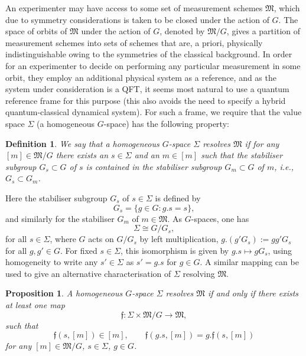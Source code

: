 \documentclass[sn-mathphys-num]{sn-jnl}%
\numberwithin{equation}{section}
\theoremstyle{thmstyleone}%
\newtheorem{proposition}[theorem]{Proposition}%
\theoremstyle{thmstyletwo}%
\theoremstyle{thmstylethree}%
\newtheorem{definition}[theorem]{Definition}%
\begin{document}
An experimenter may have access to some set of measurement schemes $\mathfrak{M}$, which due to symmetry considerations is taken to be closed under the action of $G$. The space of orbits of $\mathfrak{M}$ under the action of $G$, denoted by $\mathfrak{M}/G$, gives a partition of measurement schemes into sets of schemes that are, a priori, physically indistinguishable owing to the symmetries of the classical background. In order for an experimenter to decide on performing any particular measurement in some orbit, they 
employ an additional physical system as a reference, and as the system under consideration is a QFT, it seems most natural to 
use a quantum reference frame for this purpose (this also avoids the need to specify a hybrid quantum-classical dynamical system). For such a frame, we require that the value space $\Sigma$ (a homogeneous $G$-space) has the following property: 
\begin{definition}\label{def:suf_res}
    We say that a homogeneous $G$-space $\Sigma$ \textup{resolves} $\mathfrak{M}$ if for any $[m]\in \mathfrak{M}/G$ there exists an $s\in \Sigma$ and an $m\in[m]$ such that the stabiliser subgroup $G_s\subset G$ of $s$ is contained in the stabiliser subgroup $G_m\subset G$ of $m$, i.e., $G_s\subset G_m$.  
\end{definition}
Here the stabiliser subgroup $G_s$ of $s\in\Sigma$ is defined by
\begin{equation}
    G_s=\{g\in G:g.s=s\},
\end{equation}
and similarly for the stabiliser $G_m$ of $m\in\mathfrak{M}$. As $G$-spaces, one has 
\begin{equation}
    \Sigma\cong G/G_s,
\end{equation}
for all $s\in\Sigma$, where $G$ acts on $G/G_s$ by left multiplication,  $g.(g'G_s):=gg'G_s$  for all $g,g'\in G$. For fixed $s\in \Sigma$, this isomorphism is given by $g.s\mapsto gG_s$, using homogeneity to write any $s'\in \Sigma$ as $s'=g.s$ for $g\in G$. A similar mapping can be used to give an alternative characterisation of $\Sigma$ resolving $\mathfrak{M}$. 
\begin{proposition}
\label{prop:qrf_measurement_assignment}
A homogeneous $G$-space $\Sigma$ resolves $\mathfrak{M}$ if and only if there exists at least one map
\begin{equation}
    \mathfrak{f}:\Sigma\times \mathfrak{M}/G\to \mathfrak{M},
\end{equation}
such that
\begin{equation}
    \label{eq:qrf_measurement_assignment}
    \mathfrak{f}(s,[m])\in [m],\qquad\mathfrak{f}(g.s,[m])=g.\mathfrak{f}(s,[m])
\end{equation}
 for any $[m]\in \mathfrak{M}/G$, $s\in \Sigma$, $g\in G$.
\end{proposition}
\end{document}
